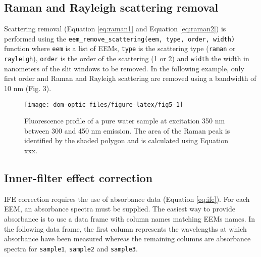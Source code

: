 \documentclass[]{book}
\newenvironment{Shaded}{\begin{snugshade}}{\end{snugshade}}
\newcommand{\KeywordTok}[1]{\textcolor[rgb]{0.13,0.29,0.53}{\textbf{{#1}}}}
\newcommand{\DataTypeTok}[1]{\textcolor[rgb]{0.13,0.29,0.53}{{#1}}}
\newcommand{\DecValTok}[1]{\textcolor[rgb]{0.00,0.00,0.81}{{#1}}}
\newcommand{\StringTok}[1]{\textcolor[rgb]{0.31,0.60,0.02}{{#1}}}
\newcommand{\NormalTok}[1]{{#1}}
\begin{document}
\subsection{Raman and Rayleigh scattering
removal}\label{raman-and-rayleigh-scattering-removal}

Scattering removal (Equation \ref{eq:raman1} and Equation
\ref{eq:raman2}) is performed using the
\texttt{eem\_remove\_scattering(eem,\ type,\ order,\ width)} function
where \texttt{eem} is a list of EEMs, \texttt{type} is the scattering
type (\texttt{raman} or \texttt{rayleigh}), \texttt{order} is the order
of the scattering (1 or 2) and \texttt{width} the width in nanometers of
the slit windows to be removed. In the following example, only first
order and Raman and Rayleigh scattering are removed using a bandwidth of
10 nm (Fig. 3).

\begin{Shaded}
\end{Shaded}

\begin{figure}

{\centering \texttt{[image: dom-optic\_files/figure-latex/fig5-1]} 

}

\caption{Fluorescence profile of a pure water sample at excitation 350 nm between 300 and 450 nm emission. The area of the Raman peak is identified by the shaded polygon and is calculated using Equation xxx.}\label{fig:fig5}
\end{figure}

\subsection{Inner-filter effect
correction}\label{inner-filter-effect-correction-1}

IFE correction requires the use of absorbance data (Equation
\ref{eq:ife}). For each EEM, an absorbance spectra must be supplied. The
easiest way to provide absorbance is to use a data frame with column
names matching EEMs names. In the following data frame, the first column
represents the wavelengths at which absorbance have been measured
whereas the remaining columns are absorbance spectra for
\texttt{sample1}, \texttt{sample2} and \texttt{sample3}.
\end{document}
